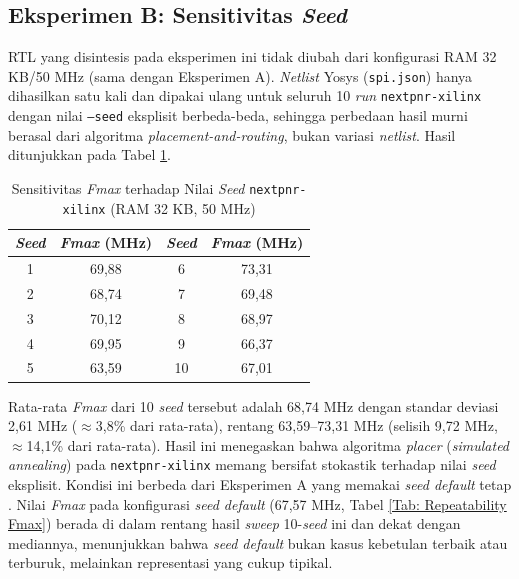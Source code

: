 \subsection{Eksperimen B: Sensitivitas \textit{Seed}}
\label{subsec:eksperimen-b}

RTL yang disintesis pada eksperimen ini tidak diubah dari konfigurasi RAM 32 KB/50 MHz (sama dengan Eksperimen A). \textit{Netlist} Yosys (\texttt{spi.json}) hanya dihasilkan satu kali dan dipakai ulang untuk seluruh 10 \textit{run} \texttt{nextpnr-xilinx} dengan nilai \texttt{--seed} eksplisit berbeda-beda, sehingga perbedaan hasil murni berasal dari algoritma \textit{placement-and-routing}, bukan variasi \textit{netlist}. Hasil ditunjukkan pada Tabel \ref{Tab: Sensitivitas Seed}.

\begin{table}[h]
	\centering
	\begin{tabular}{|c|c||c|c|}
		\hline
		\textbf{\textit{Seed}} & \textbf{\textit{Fmax} (MHz)} & \textbf{\textit{Seed}} & \textbf{\textit{Fmax} (MHz)} \\
		\hline
		1 & 69,88 & 6 & 73,31 \\ \hline
		2 & 68,74 & 7 & 69,48 \\ \hline
		3 & 70,12 & 8 & 68,97 \\ \hline
		4 & 69,95 & 9 & 66,37 \\ \hline
		5 & 63,59 & 10 & 67,01 \\ \hline
	\end{tabular}
	\vspace{0.5em}
	\caption{Sensitivitas \textit{Fmax} terhadap Nilai \textit{Seed} \texttt{nextpnr-xilinx} (RAM 32 KB, 50 MHz)}
	\label{Tab: Sensitivitas Seed}
\end{table}

Rata-rata \textit{Fmax} dari 10 \textit{seed} tersebut adalah 68,74 MHz dengan standar deviasi 2,61 MHz ($\approx$3,8\% dari rata-rata), rentang 63,59--73,31 MHz (selisih 9,72 MHz, $\approx$14,1\% dari rata-rata). Hasil ini menegaskan bahwa algoritma \textit{placer} (\textit{simulated annealing}) pada \texttt{nextpnr-xilinx} memang bersifat stokastik terhadap nilai \textit{seed} eksplisit. Kondisi ini berbeda dari Eksperimen A yang memakai \textit{seed default} tetap \cite{darvishi2025pipeline}. Nilai \textit{Fmax} pada konfigurasi \textit{seed default} (67,57 MHz, Tabel \ref{Tab: Repeatability Fmax}) berada di dalam rentang hasil \textit{sweep} 10-\textit{seed} ini dan dekat dengan mediannya, menunjukkan bahwa \textit{seed default} bukan kasus kebetulan terbaik atau terburuk, melainkan representasi yang cukup tipikal.

